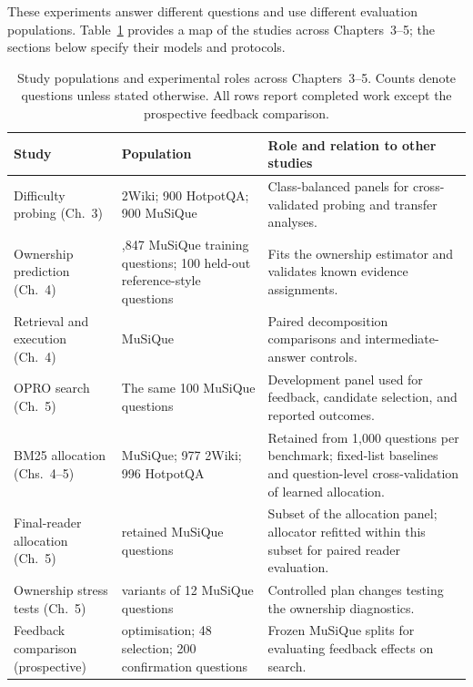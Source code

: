These experiments answer different questions and use different evaluation
populations. Table~\ref{tab:study-populations} provides a map of the studies
across Chapters~3--5; the sections below specify their models and protocols.

\begin{table}[H]
\centering
\small
\caption{Study populations and experimental roles across Chapters~3--5.
Counts denote questions unless stated otherwise. All rows report completed
work except the prospective feedback comparison.}
\label{tab:study-populations}
\begin{tabular}{@{}>{\raggedright\arraybackslash}p{}>{\raggedright\arraybackslash}p{}>{\raggedright\arraybackslash}p{}@{}}
\hline
Study & Population & Role and relation to other studies \\
\hline
Difficulty probing (Ch.~3) & 600 2Wiki; 900 HotpotQA; 900 MuSiQue &
Class-balanced panels for cross-validated probing and transfer analyses. \\
Ownership prediction (Ch.~4) & 6,847 MuSiQue training questions; 100 held-out reference-style questions &
Fits the ownership estimator and validates known evidence assignments. \\
Retrieval and execution (Ch.~4) & 100 MuSiQue &
Paired decomposition comparisons and intermediate-answer controls. \\
OPRO search (Ch.~5) & The same 100 MuSiQue questions &
Development panel used for feedback, candidate selection, and reported outcomes. \\
BM25 allocation (Chs.~4--5) & 824 MuSiQue; 977 2Wiki; 996 HotpotQA &
Retained from 1,000 questions per benchmark; fixed-list baselines and question-level cross-validation of learned allocation. \\
Final-reader allocation (Ch.~5) & 700 retained MuSiQue questions &
Subset of the allocation panel; allocator refitted within this subset for paired reader evaluation. \\
Ownership stress tests (Ch.~5) & 52 variants of 12 MuSiQue questions &
Controlled plan changes testing the ownership diagnostics. \\
Feedback comparison (prospective) & 96 optimisation; 48 selection; 200 confirmation questions &
Frozen MuSiQue splits for evaluating feedback effects on search. \\
\hline
\end{tabular}
\end{table}

